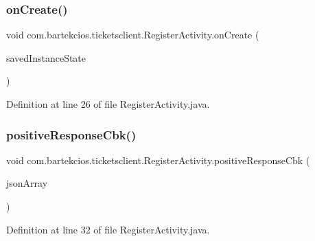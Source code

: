 \subsubsection{\texorpdfstring{on\+Create()}{onCreate()}}
{\footnotesize\ttfamily void com.\+bartekcios.\+ticketsclient.\+Register\+Activity.\+on\+Create (\begin{DoxyParamCaption}\item[{Bundle}]{saved\+Instance\+State }\end{DoxyParamCaption})\hspace{0.3cm}{\ttfamily [protected]}}



Definition at line 26 of file Register\+Activity.\+java.

\mbox{\label{classcom_1_1bartekcios_1_1ticketsclient_1_1_register_activity_ac6ff244e4175ca87432b78be7c507d66}} 
\subsubsection{\texorpdfstring{positive\+Response\+Cbk()}{positiveResponseCbk()}}
{\footnotesize\ttfamily void com.\+bartekcios.\+ticketsclient.\+Register\+Activity.\+positive\+Response\+Cbk (\begin{DoxyParamCaption}\item[{J\+S\+O\+N\+Array}]{json\+Array }\end{DoxyParamCaption})}



Definition at line 32 of file Register\+Activity.\+java.

